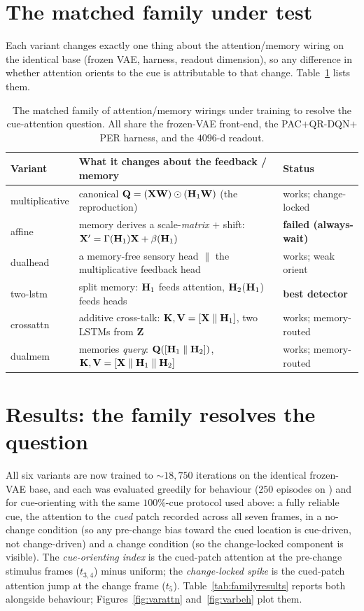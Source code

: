 \section{The matched family under test}
Each variant changes exactly one thing about the attention/memory wiring on the identical
base (frozen VAE, harness, readout dimension), so any difference in whether attention
orients to the cue is attributable to that change. Table~\ref{tab:family} lists them.

\begin{table}[t]
\centering
\caption{The matched family of attention/memory wirings under training to resolve the
cue-attention question. All share the frozen-VAE front-end, the PAC$+$QR-DQN$+$PER harness,
and the $4096$-d readout.}
\label{tab:family}
\small
\begin{tabular}{p{2.2cm}p{7.2cm}p{2.0cm}}
\toprule
Variant & What it changes about the feedback / memory & Status \\
\midrule
multiplicative & canonical $\mathbf Q=(\mathbf{X}\mathbf W)\odot(\mathbf{H}_1\mathbf W)$ (the reproduction) & works; change-locked \\
affine & memory derives a scale-\emph{matrix} $+$ shift: $\mathbf{X}'=\Gamma(\mathbf{H}_1)\mathbf{X}+\beta(\mathbf{H}_1)$ & \textbf{failed (always-wait)} \\
dualhead & a memory-free sensory head $\parallel$ the multiplicative feedback head & works; weak orient \\
two-lstm & split memory: $\mathbf{H}_1$ feeds attention, $\mathbf{H}_2$($\mathbf{H}_1$) feeds heads & \textbf{best detector} \\
crossattn & additive cross-talk: $\mathbf K,\mathbf V=[\mathbf{X}\parallel\mathbf{H}_1]$, two LSTMs from $\mathbf Z$ & works; memory-routed \\
dualmem & memories \emph{query}: $\mathbf Q([\mathbf{H}_1\parallel\mathbf{H}_2])$, $\mathbf K,\mathbf V=[\mathbf{X}\parallel\mathbf{H}_1\parallel\mathbf{H}_2]$ & works; memory-routed \\
\bottomrule
\end{tabular}
\end{table}

\section{Results: the family resolves the question}
All six variants are now trained to $\sim$$18{,}750$ iterations on the identical frozen-VAE
base, and each was evaluated greedily for behaviour ($250$ episodes on ) and
for cue-orienting with the same $100\%$-cue protocol used above: a fully reliable cue, the
attention to the \emph{cued} patch recorded across all seven frames, in a no-change
condition (so any pre-change bias toward the cued location is cue-driven, not change-driven)
and a change condition (so the change-locked component is visible). The
\emph{cue-orienting index} is the cued-patch attention at the pre-change stimulus frames
($t_{3,4}$) minus uniform; the \emph{change-locked spike} is the cued-patch attention jump
at the change frame ($t_5$). Table~\ref{tab:familyresults} reports both alongside behaviour;
Figures~\ref{fig:varattn} and~\ref{fig:varbeh} plot them.

